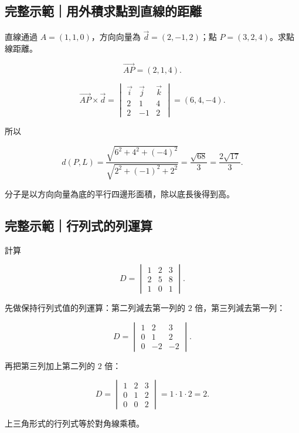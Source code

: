 \documentclass[11pt,a4paper]{article}
\begin{document}
\begin{HandoutWorkedExample}

\subsection{完整示範｜用外積求點到直線的距離}\label{ux5b8cux6574ux793aux7bc4ux7528ux5916ux7a4dux6c42ux9edeux5230ux76f4ux7ddaux7684ux8dddux96e2}

直線通過 \(A=(1,1,0)\)，方向向量為 \(\vec d=(2,-1,2)\)；點 \(P=(3,2,4)\)。求點線距離。

\[
\overrightarrow{AP}=(2,1,4).
\]

\[
\overrightarrow{AP}\times\vec d
=
\begin{vmatrix}
\vec i&\vec j&\vec k\\
2&1&4\\
2&-1&2
\end{vmatrix}
=(6,4,-4).
\]

所以

\[
d(P,L)
=\frac{\sqrt{6^2+4^2+(-4)^2}}{\sqrt{2^2+(-1)^2+2^2}}
=\frac{\sqrt{68}}3
=\boxed{\frac{2\sqrt{17}}3}.
\]

分子是以方向向量為底的平行四邊形面積，除以底長後得到高。

\end{HandoutWorkedExample}

\begin{HandoutWorkedExample}

\subsection{完整示範｜行列式的列運算}\label{ux5b8cux6574ux793aux7bc4ux884cux5217ux5f0fux7684ux5217ux904bux7b97}

計算

\[
D=
\begin{vmatrix}
1&2&3\\
2&5&8\\
1&0&1
\end{vmatrix}.
\]

先做保持行列式值的列運算：第二列減去第一列的 \(2\) 倍，第三列減去第一列：

\[
D=
\begin{vmatrix}
1&2&3\\
0&1&2\\
0&-2&-2
\end{vmatrix}.
\]

再把第三列加上第二列的 \(2\) 倍：

\[
D=
\begin{vmatrix}
1&2&3\\
0&1&2\\
0&0&2
\end{vmatrix}=1\cdot1\cdot2=\boxed2.
\]

上三角形式的行列式等於對角線乘積。

\end{HandoutWorkedExample}
\end{document}

